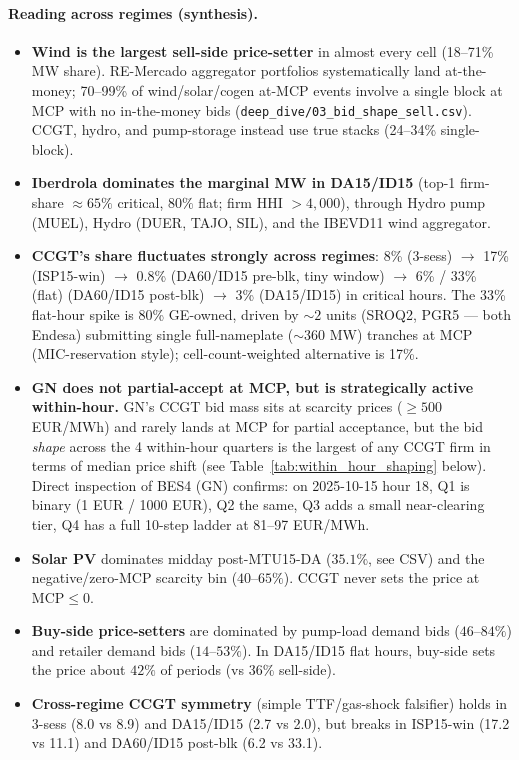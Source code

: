 \documentclass[11pt,a4paper]{article}
\newcommand{\code}[1]{\nolinkurl{#1}}
\begin{document}
\paragraph{Reading across regimes (synthesis).}
\begin{itemize}
\item \textbf{Wind is the largest sell-side price-setter} in almost every cell (18--71\% MW share). RE-Mercado aggregator portfolios systematically land at-the-money; 70--99\% of wind/solar/cogen at-MCP events involve a single block at MCP with no in-the-money bids (\code{deep_dive/03_bid_shape_sell.csv}). CCGT, hydro, and pump-storage instead use true stacks (24--34\% single-block).
\item \textbf{Iberdrola dominates the marginal MW in DA15/ID15} (top-1 firm-share $\approx 65\%$ critical, $80\%$ flat; firm HHI $> 4{,}000$), through Hydro pump (MUEL), Hydro (DUER, TAJO, SIL), and the IBEVD11 wind aggregator.
\item \textbf{CCGT's share fluctuates strongly across regimes}: 8\% (3-sess) $\to$ 17\% (ISP15-win) $\to$ 0.8\% (DA60/ID15 pre-blk, tiny window) $\to$ 6\% / 33\% (flat) (DA60/ID15 post-blk) $\to$ 3\% (DA15/ID15) in critical hours. The 33\% flat-hour spike is 80\% GE-owned, driven by $\sim 2$ units (SROQ2, PGR5 --- both Endesa) submitting single full-nameplate ($\sim$360 MW) tranches at MCP (MIC-reservation style); cell-count-weighted alternative is 17\%.
\item \textbf{GN does not partial-accept at MCP, but is strategically active within-hour.} GN's CCGT bid mass sits at scarcity prices ($\geq 500$ EUR/MWh) and rarely lands at MCP for partial acceptance, but the bid \emph{shape} across the 4 within-hour quarters is the largest of any CCGT firm in terms of median price shift (see Table~\ref{tab:within_hour_shaping} below). Direct inspection of BES4 (GN) confirms: on 2025-10-15 hour 18, Q1 is binary (1 EUR / 1000 EUR), Q2 the same, Q3 adds a small near-clearing tier, Q4 has a full 10-step ladder at 81--97 EUR/MWh.
\item \textbf{Solar PV} dominates midday post-MTU15-DA ($35.1\%$, see CSV) and the negative/zero-MCP scarcity bin ($40$--$65\%$). CCGT never sets the price at $\text{MCP}\le 0$.
\item \textbf{Buy-side price-setters} are dominated by pump-load demand bids ($46$--$84\%$) and retailer demand bids ($14$--$53\%$). In DA15/ID15 flat hours, buy-side sets the price about $42\%$ of periods (vs $36\%$ sell-side).
\item \textbf{Cross-regime CCGT symmetry} (simple TTF/gas-shock falsifier) holds in 3-sess (8.0 vs 8.9) and DA15/ID15 (2.7 vs 2.0), but breaks in ISP15-win (17.2 vs 11.1) and DA60/ID15 post-blk (6.2 vs 33.1).
\end{itemize}
\end{document}

